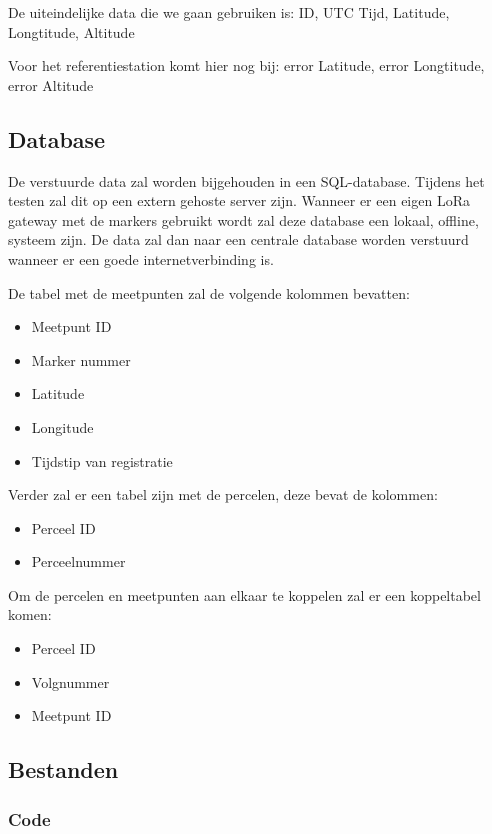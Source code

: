 De uiteindelijke data die we gaan gebruiken is:
ID, UTC Tijd, Latitude, Longtitude, Altitude

Voor het referentiestation komt hier nog bij:
error Latitude, error Longtitude, error Altitude

\subsection{Database}
\label{sec:database}

De verstuurde data zal worden bijgehouden in een SQL-database. Tijdens het testen
zal dit op een extern gehoste server zijn.
Wanneer er een eigen LoRa gateway met de markers gebruikt wordt zal deze database
een lokaal, offline, systeem zijn. De data zal dan naar een centrale database
worden verstuurd wanneer er een goede internetverbinding is.

De tabel met de meetpunten zal de volgende kolommen bevatten:
\begin{itemize}
    \item Meetpunt ID
    \item Marker nummer
    \item Latitude
    \item Longitude
    \item Tijdstip van registratie
\end{itemize}

Verder zal er een tabel zijn met de percelen, deze bevat de kolommen:
\begin{itemize}
    \item Perceel ID
    \item Perceelnummer
\end{itemize}

Om de percelen en meetpunten aan elkaar te koppelen zal er een koppeltabel komen:
\begin{itemize}
    \item Perceel ID
    \item Volgnummer
    \item Meetpunt ID
\end{itemize}

\subsection{Bestanden}
\subsubsection{Code}
